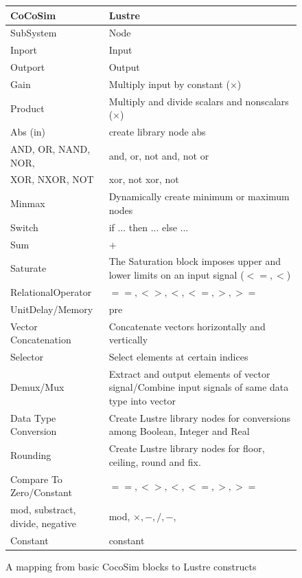 \documentclass{article}
\begin{document}
\begin{figure}[t]
\centering
{
\begin{tabular}{lp{7cm}}
\hline
\textbf{CoCoSim} & \textbf{Lustre}  \\
\hline
SubSystem & 
Node
\\
Inport &
Input
\\
Outport &
Output
\\
Gain &
Multiply input by constant ($\times$)
\\

Product &
Multiply and divide scalars and nonscalars ($\times$)
\\

Abs (in) &
create library node abs
\\

AND, OR, NAND, NOR,
&
and, or, not and, not or
\\
XOR, NXOR, NOT
&
xor, not xor, not
\\
Minmax &
{Dynamically create minimum or maximum nodes}
\\

Switch &
{if ... then ... else ... }
\\

Sum &
$+$
\\

Saturate &
The Saturation block imposes upper and lower limits on an input signal ($<=, <$)
\\

RelationalOperator &
$==, <>, <, <=, >, >=$
\\

UnitDelay/Memory &
pre
\\

Vector Concatenation &
Concatenate vectors horizontally and vertically
\\

Selector &
Select elements at certain indices
\\

Demux/Mux &
Extract and output elements of vector signal/Combine input signals of same data type into vector
\\

Data Type Conversion &
Create Lustre library nodes for conversions among Boolean, Integer and Real
\\

Rounding &
Create Lustre library nodes for floor, ceiling, round and fix.  
\\

Compare To Zero/Constant  &
$==, <>, <, <=, >, >=$
\\

mod, substract, divide, negative &
mod, $\times, -, /, - $, 
\\

Constant &
constant
\\

\hline
\end{tabular}
}
\caption{A mapping from basic CocoSim blocks to Lustre constructs}
\label{basicmapping}
\end{figure}
\end{document}
